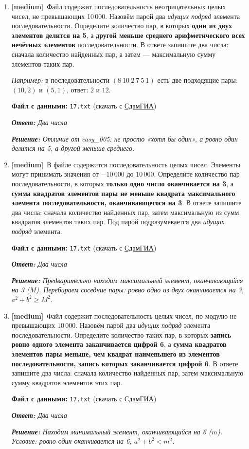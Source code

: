 \documentclass[a4paper]{article}
\newcommand{\medtag}{\textcolor{medcolor}{\textbf{[medium]}}}
\newcommand{\answer}[1]{\par\smallskip\textit{\textbf{Ответ:} #1}}
\newcommand{\solution}[1]{\par\textit{\textbf{Решение:} #1}}
\newcommand{\filehint}[1]{\par\smallskip\textbf{Файл с данными:} \texttt{#1} (скачать с \href{https://inf-ege.sdamgia.ru/}{СдамГИА})}
\begin{document}
\begin{enumerate}[label=\textbf{Задача \arabic*.}, leftmargin=*, itemsep=10mm]

  \item %
  \medtag\ Файл содержит последовательность неотрицательных целых чисел, не превышающих
  10\,000. Назовём парой два \emph{идущих подряд} элемента последовательности.
  Определите количество пар, в которых \textbf{один из двух элементов делится на 5},
  а \textbf{другой меньше среднего арифметического всех нечётных элементов}
  последовательности. В ответе запишите два числа: сначала количество найденных
  пар, а затем — максимальную сумму элементов таких пар.

  \textit{Например:} в последовательности $(8\ 10\ 2\ 7\ 5\ 1)$ есть две подходящие
  пары: $(10, 2)$ и $(5, 1)$, ответ: $2$ и $12$.
  \filehint{17.txt}
  \answer{Два числа}
  \solution{Отличие от easy\_005: не просто «хотя бы один», а ровно один делится на 5, а другой меньше среднего.}

  \bigskip

  \item %
  \medtag\ В файле содержится последовательность целых чисел.
  Элементы могут принимать значения от $-10\,000$ до $10\,000$.
  Определите количество пар последовательности, в которых \textbf{только одно
  число оканчивается на 3}, а \textbf{сумма квадратов элементов пары не меньше
  квадрата максимального элемента последовательности, оканчивающегося на 3}.
  В ответе запишите два числа: сначала количество найденных пар, затем
  максимальную из сумм квадратов элементов таких пар.
  Под парой подразумевается два \emph{идущих подряд} элемента.
  \filehint{17.txt}
  \answer{Два числа}
  \solution{Предварительно находим максимальный элемент, оканчивающийся на 3 ($M$). Перебираем соседние пары: ровно одно из двух оканчивается на 3, $a^2+b^2 \geq M^2$.}

  \bigskip

  \item %
  \medtag\ Файл содержит последовательность целых чисел, по модулю не превышающих
  10\,000. Назовём парой два \emph{идущих подряд} элемента последовательности.
  Определите количество таких пар, в которых \textbf{запись ровно одного элемента
  заканчивается цифрой 6}, а \textbf{сумма квадратов элементов пары меньше, чем
  квадрат наименьшего из элементов последовательности, запись которых заканчивается
  цифрой 6}.
  В ответе запишите два числа: сначала количество найденных пар, затем
  максимальную сумму квадратов элементов этих пар.
  \filehint{17.txt}
  \answer{Два числа}
  \solution{Находим минимальный элемент, оканчивающийся на 6 ($m$). Условие: ровно один оканчивается на 6, $a^2+b^2 < m^2$.}


\end{enumerate}
\end{document}
